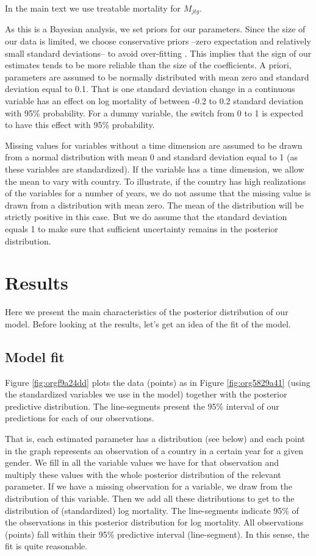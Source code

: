 \documentclass{article}
\begin{document}
In the main text we use treatable mortality for \(M_{jtg}\).

As this is a Bayesian analysis, we set priors for our parameters. Since the size of our data is limited, we choose conservative priors --zero expectation and relatively small standard deviations-- to avoid over-fitting  \citep{mcelreath}. This implies that the sign of our estimates tends to be more reliable than the size of the coefficients. A priori, parameters are assumed to be normally distributed with mean zero and standard deviation equal to 0.1. That is one standard deviation change in a continuous variable has an effect on log mortality of between -0.2 to 0.2 standard deviation with 95\% probability. For a dummy variable, the switch from 0 to 1 is expected to have this effect with 95\% probability.

Missing values for variables without a time dimension are assumed to be drawn from a normal distribution with mean 0 and standard deviation equal to 1 (as these variables are standardized). If the variable has a time dimension, we allow the mean to vary with country. To illustrate, if the country has high realizations of the variables for a number of years, we do not assume that the missing value is drawn from a distribution with mean zero. The mean of the distribution will be strictly positive in this case. But we do assume that the standard deviation equals 1 to make sure that sufficient uncertainty remains in the posterior distribution.


\section{Results}
\label{sec:org2079f8a}

Here we present the main characteristics of the posterior distribution of our model. Before looking at the results, let's get an idea of the fit of the model.

\subsection{Model fit}
\label{sec:org07c8de3}

Figure \ref{fig:orgf9a24dd} plots the data (points) as in Figure \ref{fig:org5829a41} (using the standardized variables we use in the model) together with the posterior predictive distribution. The line-segments present the 95\% interval of our predictions for each of our observations.

That is, each estimated parameter has a distribution (see below) and each point in the graph represents an observation of a country in a certain year for a given gender. We fill in all the variable values we have for that observation and multiply these values with the whole posterior distribution of the relevant parameter. If we have a missing observation for a variable, we draw from the distribution of this variable. Then we add all these distributions to get to the distribution of (standardized) log mortality. The line-segments indicate 95\% of the observations in this posterior distribution for log mortality. All observations (points) fall within their 95\% predictive interval (line-segment). In this sense, the fit is quite reasonable.
\end{document}
